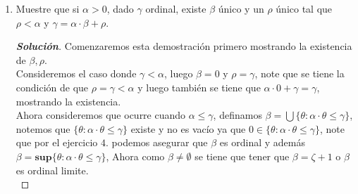 \documentclass[11pt]{article}
\numberwithin{equation}{section}
\numberwithin{figure}{section}
\begin{document}
\begin{enumerate}
\begin{proof}[\textbf{Solución}]
\begin{itemize}
        Supongamos que la propiedad se cumple para todo ordinal $\theta<\gamma$, ahora consideremos que pasa cuando $\gamma$ es sucesor de un ordinal, es decir $\gamma=\zeta+1>\zeta$.
        \begin{equation*}
            \alpha^{\zeta+1}=\alpha^\zeta\cdot\alpha\leq\beta^\zeta\cdot\alpha<\beta^\zeta\cdot\beta=\beta^{\zeta+1}\Rightarrow\alpha^{\zeta+1}\leq\beta^{\zeta+1}
        \end{equation*}
        Por ultimo consideremos el caso donde $\gamma$ es ordinal limite, por definición:
        \begin{equation*}
            \alpha^\gamma=\textbf{sup}\{\theta<\gamma:\alpha^\theta\}
        \end{equation*}
        Ahora supongamos que $\beta^\gamma<\alpha^\gamma$, esto implica que no es cota superior de $\textbf{sup}\{\theta<\gamma:\alpha^\theta\}$ y por tanto existe $\zeta<\gamma$ tal que $\beta^\gamma<\alpha^\zeta$, luego tenemos que:
        \begin{equation*}
            \beta^\zeta\leq\textbf{sup}\{\delta<\gamma:\beta^\delta\}=\beta^\gamma<\alpha^\zeta\Rightarrow\beta^\zeta<\alpha^\zeta
        \end{equation*}
        Note que esto ultimo contradice la hipótesis de inducción por lo tanto se debe de tener que la propiedad también se cumple en este caso y por tanto para todo ordinal.
    \end{itemize}
    \end{proof}
    \item Muestre que si $\alpha>0$, dado $\gamma$ ordinal, existe $\beta$ único y un $\rho$ único tal que $\rho<\alpha$ y $\gamma=\alpha\cdot\beta+\rho$.
    \begin{proof}[\textbf{Solución}]
    Comenzaremos esta demostración primero mostrando la existencia de $\beta,\rho$.\\
    Consideremos el caso donde $\gamma<\alpha$, luego $\beta=0$ y $\rho=\gamma$, note que se tiene la condición de que $\rho=\gamma<\alpha$ y luego también se tiene que $\alpha\cdot0+\gamma=\gamma$, mostrando la existencia.\\
    Ahora consideremos que ocurre cuando $\alpha\leq\gamma$, definamos $\beta=\bigcup\{\theta:\alpha\cdot\theta\leq\gamma\}$, notemos que $\{\theta:\alpha\cdot\theta\leq\gamma\}$ existe y no es vacío ya que $0\in\{\theta:\alpha\cdot\theta\leq\gamma\}$, note que por el ejercicio $4.$ podemos asegurar que $\beta$ es ordinal y además $\beta=\textbf{sup}\{\theta:\alpha\cdot\theta\leq\gamma\}$, Ahora como $\beta\neq\emptyset$ se tiene que tener que $\beta=\zeta+1$ o $\beta$ es ordinal limite.\\

\end{proof}
\end{enumerate}
\end{document}
